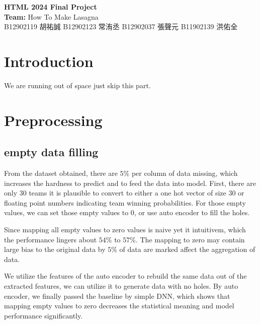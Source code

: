 \documentclass[10pt,a4paper]{article}
\begin{document}
\begin{center}
  {\LARGE \bf HTML 2024 Final Project}\\[8pt]
  \textbf{Team:} How To Make Lasagna\\
  B12902119 胡祐誠
  B12902123 常洧丞
  B12902037 張聲元
  B11902139 洪佑全
\end{center}


\section{Introduction}
We are running out of space just skip this part.

\section{Preprocessing}
\subsection{empty data filling}
From the dataset obtained, there are $5\%$ per column of data missing, which increases the hardness to predict and to feed the data into model.
First, there are only $30$ teams it is plausible to convert to either a one hot vector of size $30$ or floating point numbers indicating team winning probabilities.
For those empty values, we can set those empty values to $0$, or use auto encoder to fill the holes.

Since mapping all empty values to zero values is naive yet it intuitivem, which the performance lingers about $54\%$ to $57\%$.
The mapping to zero may contain large bias to the original data by $5\%$ of data are marked affect the aggregation of data.

We utilize the features of the auto encoder to rebuild the same data out of the extracted features, we can utilize it to generate data with no holes.
By auto encoder, we finally passed the baseline by simple DNN, which shows that mapping empty values to zero decreases the statistical meaning and model performance significantly.
\end{document}
